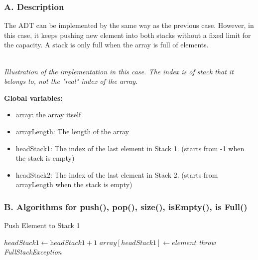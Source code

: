 \documentclass[16pt, letterpaper]{article}
\newcounter{nodeidx}
\newcommand{\nodes}[1]{%
    \foreach \num in {#1}{
      \node[minimum size=6mm, draw, rectangle] (\arabic{nodeidx}) at (\arabic{nodeidx},0) {\num};
      \stepcounter{nodeidx}
    }
    \setcounter{nodeidx}{1}
}
\newcommand{\brckt}[4]{%
  \draw (#1.south west) ++($(-.1, -.1) + (-.1*#3, 0)$) -- ++($(0,-.1) + (0,-#3*1.25em)$) -- node [below] {#4} ($(#2.south east) + (.1,-.1) + (.1*#3, 0) + (0,-.1) + (0,-#3*1.25em)$) -- ++($(0,#3*1.25em) + (0,.1)$);%
}
\begin{document}
\subsubsection*{A. Description}
The ADT can be implemented by the same way as the previous case. However, in this case, it keeps pushing new element into both stacks without a fixed limit for the capacity. A stack is only full when the array is full of elements.

\\
\textit{Illustration of the implementation in this case. The index is of stack that it belongs to, not the "real" index of the array.}

\textbf{Global variables:}
\begin{itemize} 
    \item array: the array itself
    \item arrayLength: The length of the array
    \item headStack1: The index of the last element in Stack 1. (starts from -1 when the stack is empty)
    \item headStack2: The index of the last element in Stack 2. (starts from arrayLength when the stack is empty)
\end{itemize}

\subsubsection*{B. Algorithms for push(), pop(), size(), isEmpty(), is Full()}
\begin{algorithm} [H]
\caption{Push Element to Stack 1}
\begin{algorithmic}[1]
	 {}
		\State$headStack1 \gets \textit{headStack1} + 1$
		\State$array[headStack1] \gets \textit{element}$
	\Else
		\State\textit{throw FullStackException}
	\EndIf
	\EndProcedure
\end{algorithmic}
\end{algorithm}
\end{document}
